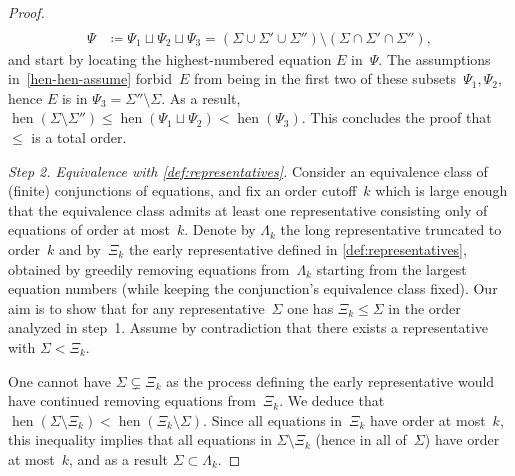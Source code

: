 \documentclass[12pt]{amsart}
\theoremstyle{plain}
\theoremstyle{definition}
\DeclareMathOperator{\hen}{hen}
\begin{document}
\begin{proof}
\begin{equation}
\begin{aligned}
    \\
    \Psi & \coloneqq \Psi_1 \sqcup \Psi_2 \sqcup \Psi_3 = (\Sigma\cup\Sigma'\cup\Sigma'')\setminus(\Sigma\cap\Sigma'\cap\Sigma'') ,
  \end{aligned}
\end{equation}
and start by locating the highest-numbered equation $E$ in~$\Psi$.
The assumptions in~\eqref{hen-hen-assume} forbid~$E$ from being in the first two of these subsets~$\Psi_1,\Psi_2$, hence $E$ is in $\Psi_3=\Sigma''\setminus\Sigma$.  As a result, $\hen(\Sigma\setminus\Sigma'')\leq\hen(\Psi_1\sqcup\Psi_2)<\hen(\Psi_3)$.
This concludes the proof that $\leq$ is a total order.

\medskip

{\it Step 2. Equivalence with \autoref{def:representatives}.}
Consider an equivalence class of (finite) conjunctions of equations, and fix an order cutoff~$k$ which is large enough that the equivalence class admits at least one representative consisting only of equations of order at most~$k$.  Denote by $\Lambda_k$ the long representative truncated to order~$k$ and by~$\Xi_k$ the early representative defined in \autoref{def:representatives}, obtained by greedily removing equations from~$\Lambda_k$ starting from the largest equation numbers (while keeping the conjunction's equivalence class fixed).  Our aim is to show that for any representative~$\Sigma$ one has $\Xi_k\leq\Sigma$ in the order analyzed in step~1.  Assume by contradiction that there exists a representative with $\Sigma<\Xi_k$.

One cannot have $\Sigma\subsetneq\Xi_k$ as the process defining the early representative would have continued removing equations from~$\Xi_k$.  We deduce that $\hen(\Sigma\setminus\Xi_k) < \hen(\Xi_k\setminus\Sigma)$.  Since all equations in~$\Xi_k$ have order at most~$k$, this inequality implies that all equations in $\Sigma\setminus\Xi_k$ (hence in all of~$\Sigma$) have order at most~$k$, and as a result $\Sigma\subset\Lambda_k$.


\end{proof}
\end{document}
